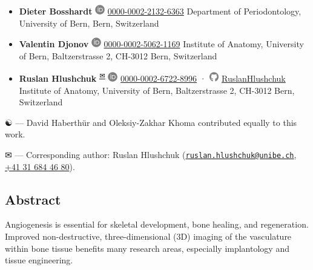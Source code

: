 \begin{itemize}
\item
  \textbf{Dieter Bosshardt}
  \includegraphics[width=0.16667in,height=0.16667in]{images/orcid.svg}
  \href{https://orcid.org/0000-0002-2132-6363}{0000-0002-2132-6363}
  Department of Periodontology, University of Bern, Bern, Switzerland
\item
  \textbf{Valentin Djonov}
  \includegraphics[width=0.16667in,height=0.16667in]{images/orcid.svg}
  \href{https://orcid.org/0000-0002-5062-1169}{0000-0002-5062-1169}
  Institute of Anatomy, University of Bern, Baltzerstrasse 2, CH-3012 Bern, Switzerland
\item
  \textbf{Ruslan Hlushchuk}
  \textsuperscript{\protect\hyperlink{correspondence}{✉}}
  \includegraphics[width=0.16667in,height=0.16667in]{images/orcid.svg}
  \href{https://orcid.org/0000-0002-6722-8996}{0000-0002-6722-8996}
  · \includegraphics[width=0.16667in,height=0.16667in]{images/github.svg}
  \href{https://github.com/RuslanHlushchuk}{RuslanHlushchuk}
  Institute of Anatomy, University of Bern, Baltzerstrasse 2, CH-3012 Bern, Switzerland
\end{itemize}

\leavevmode{}%
☯ --- David Haberthür and
Oleksiy-Zakhar Khoma contributed equally to this work.

\leavevmode{}%
✉ --- Corresponding author: Ruslan Hlushchuk (\href{mailto:ruslan.hlushchuk@unibe.ch}{\nolinkurl{ruslan.hlushchuk@unibe.ch}}, \href{tel:+41\%2031\%20684\%2046\%2080}{+41 31 684 46 80}).

\hypertarget{abstract}{%
\subsection{Abstract}\label{abstract}}

Angiogenesis is essential for skeletal development, bone healing, and regeneration.
Improved non-destructive, three-dimensional (3D) imaging of the vasculature within bone tissue benefits many research areas, especially implantology and tissue engineering.

